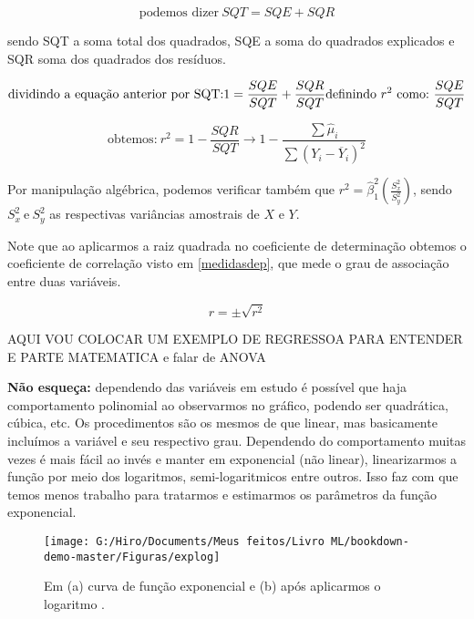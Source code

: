 \documentclass[
]{book}
\begin{document}
\begin{equation}
    \mbox{podemos dizer} \ SQT=SQE+SQR
    \label{eq:sqt}
\end{equation}

sendo SQT a soma total dos quadrados, SQE a soma do quadrados explicados e SQR soma dos quadrados dos resíduos.

\[\mbox{dividindo a equação anterior por SQT:}\\ 1=\frac{SQE}{SQT}+\frac{SQR}{SQT} \\ \mbox{definindo}\ r^2 \ \mbox{como:} \ \frac{SQE}{SQT} \]

\begin{equation}
    \mbox{obtemos:} \ r^2=1-\frac{SQR}{SQT} \rightarrow 1 - \frac{\sum \hat{\mu}_i}{\sum (Y_i - \overline{Y}_i)^2}
    \label{eq:coefdet}
\end{equation}

Por manipulação algébrica, podemos verificar também que \(r^2=\hat{\beta}^2_1(\frac{S^2_x}{S^2_y})\), sendo \(S^2_x\ \mbox{e} \ S^2_y\) as respectivas variâncias amostrais de \(X\) e \(Y\).

Note que ao aplicarmos a raiz quadrada no coeficiente de determinação obtemos o coeficiente de correlação visto em \ref{medidasdep}, que mede o grau de associação entre duas variáveis.

\[r=\pm \sqrt{r^2}\]

AQUI VOU COLOCAR UM EXEMPLO DE REGRESSOA PARA ENTENDER E PARTE MATEMATICA e falar de ANOVA

\textbf{Não esqueça:} dependendo das variáveis em estudo é possível que haja comportamento polinomial ao observarmos no gráfico, podendo ser quadrática, cúbica, etc. Os procedimentos são os mesmos de que linear, mas basicamente incluímos a variável e seu respectivo grau. Dependendo do comportamento muitas vezes é mais fácil ao invés e manter em exponencial (não linear), linearizarmos a função por meio dos logaritmos, semi-logaritmicos entre outros. Isso faz com que temos menos trabalho para tratarmos e estimarmos os parâmetros da função exponencial.

\begin{figure}

{\centering \texttt{[image: G:/Hiro/Documents/Meus feitos/Livro ML/bookdown-demo-master/Figuras/explog]} 

}

\caption{Em (a) curva de função exponencial e (b) após aplicarmos o logaritmo \citep{gujarati2011econometria}.}\label{fig:explog}
\end{figure}
\end{document}
